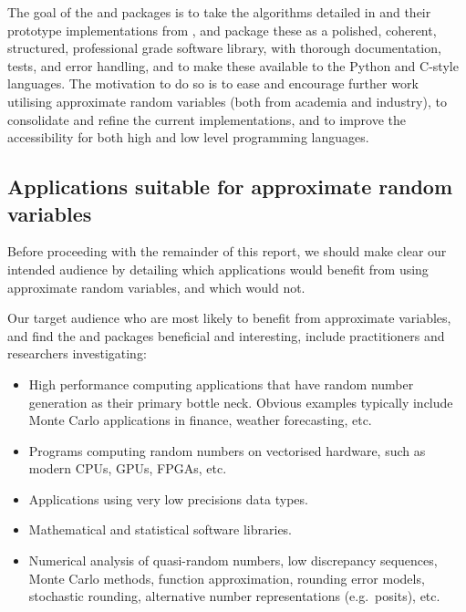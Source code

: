 The goal of the \arv and \pyarv packages is to take the algorithms detailed in \citep{giles2023approximating} and their prototype implementations from \citep{sheridan2020approximate_random}, and package these as a polished, coherent, structured, professional grade software library, with thorough documentation, tests, and error handling, and to make these available to the Python and C-style languages.  The motivation to do so is to ease and encourage further work utilising approximate random variables (both from academia and industry), to consolidate and refine the current implementations, and to improve the accessibility for both high and low level programming languages. 

\subsection{Applications suitable for approximate random variables}

Before proceeding with the remainder of this report, we should make clear our intended audience by detailing which applications would benefit from using approximate random variables, and which would not. 

Our target audience who are most likely to benefit from approximate variables, and find the \arv and \pyarv packages beneficial and interesting, include practitioners and researchers investigating:
\begin{itemize}
\item High performance computing applications that have random number generation as their primary bottle neck. Obvious examples typically include Monte Carlo applications in finance, weather forecasting, etc. 

\item Programs computing random numbers on vectorised hardware, such as modern CPUs, GPUs, FPGAs, etc. 

\item Applications using very low precisions data types. 

\item Mathematical and statistical software libraries. 

\item Numerical analysis of quasi-random numbers, low discrepancy sequences, Monte Carlo methods, function approximation, rounding error models, stochastic rounding, alternative number representations (e.g.\ posits), etc.
\end{itemize}

